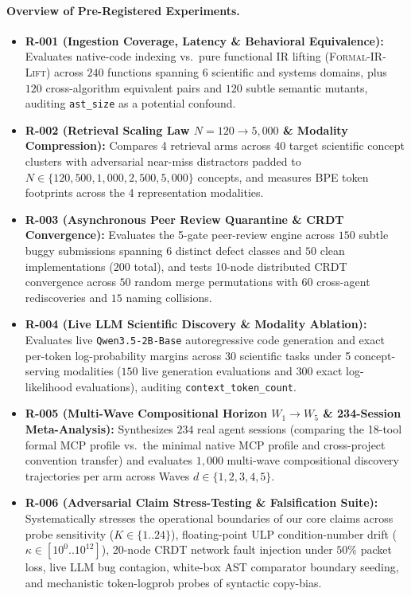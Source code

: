\documentclass[10pt,twocolumn]{article}
\begin{document}
\paragraph{Overview of Pre-Registered Experiments.}
\begin{itemize}
    \item \textbf{R-001 (Ingestion Coverage, Latency \& Behavioral Equivalence):} Evaluates native-code indexing vs.\ pure functional IR lifting (\textsc{Formal-IR-Lift}) across $240$ functions spanning 6 scientific and systems domains, plus $120$ cross-algorithm equivalent pairs and $120$ subtle semantic mutants, auditing \texttt{ast\_size} as a potential confound.
    \item \textbf{R-002 (Retrieval Scaling Law $N=120 \to 5{,}000$ \& Modality Compression):} Compares 4 retrieval arms across $40$ target scientific concept clusters with adversarial near-miss distractors padded to $N \in \{120, 500, 1{,}000, 2{,}500, 5{,}000\}$ concepts, and measures BPE token footprints across the 4 representation modalities.
    \item \textbf{R-003 (Asynchronous Peer Review Quarantine \& CRDT Convergence):} Evaluates the 5-gate peer-review engine across $150$ subtle buggy submissions spanning 6 distinct defect classes and $50$ clean implementations ($200$ total), and tests 10-node distributed CRDT convergence across $50$ random merge permutations with $60$ cross-agent rediscoveries and $15$ naming collisions.
    \item \textbf{R-004 (Live LLM Scientific Discovery \& Modality Ablation):} Evaluates live \texttt{Qwen3.5-2B-Base} autoregressive code generation and exact per-token log-probability margins across $30$ scientific tasks under 5 concept-serving modalities ($150$ live generation evaluations and $300$ exact log-likelihood evaluations), auditing \texttt{context\_token\_count}.
    \item \textbf{R-005 (Multi-Wave Compositional Horizon $W_1 \to W_5$ \& 234-Session Meta-Analysis):} Synthesizes $234$ real agent sessions (comparing the 18-tool formal MCP profile vs.\ the minimal native MCP profile and cross-project convention transfer) and evaluates $1{,}000$ multi-wave compositional discovery trajectories per arm across Waves $d \in \{1, 2, 3, 4, 5\}$.
    \item \textbf{R-006 (Adversarial Claim Stress-Testing \& Falsification Suite):} Systematically stresses the operational boundaries of our core claims across probe sensitivity ($K \in \{1..24\}$), floating-point ULP condition-number drift ($\kappa \in [10^0..10^{12}]$), 20-node CRDT network fault injection under $50\%$ packet loss, live LLM bug contagion, white-box AST comparator boundary seeding, and mechanistic token-logprob probes of syntactic copy-bias.
\end{itemize}
\end{document}
